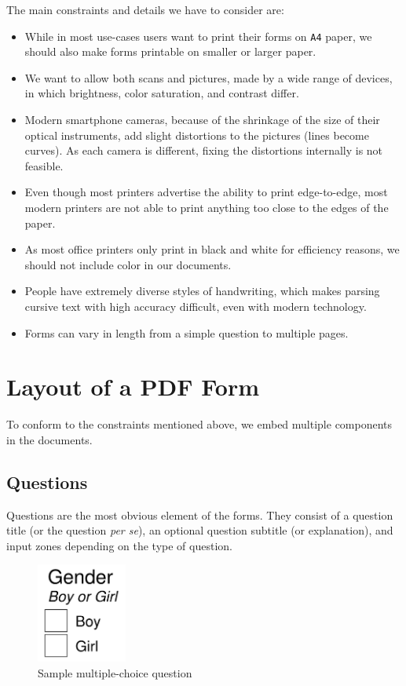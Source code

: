 \documentclass[11pt, a4paper]{report}
\def\code#1{\texttt{#1}}
\begin{document}
The main constraints and details we have to consider are:
\begin{itemize}
    \item While in most use-cases users want to print their forms on \code{A4} paper, we should also make forms printable on smaller or larger paper.
    \item We want to allow both scans and pictures, made by a wide range of devices, in which brightness, color saturation, and contrast differ.
    \item Modern smartphone cameras, because of the shrinkage of the size of their optical instruments, add slight distortions to the pictures (lines become curves). As each camera is different, fixing the distortions internally is not feasible.
    \item Even though most printers advertise the ability to print edge-to-edge, most modern printers are not able to print anything too close to the edges of the paper.
    \item As most office printers only print in black and white for efficiency reasons, we should not include color in our documents.
    \item People have extremely diverse styles of handwriting, which makes parsing cursive text with high accuracy difficult, even with modern technology.
    \item Forms can vary in length from a simple question to multiple pages.
\end{itemize}

\section{Layout of a PDF Form}

To conform to the constraints mentioned above, we embed multiple components in the documents.

\subsection{Questions}

Questions are the most obvious element of the forms. They consist of a question title (or the question \emph{per se}), an optional question subtitle (or explanation), and input zones depending on the type of question.

\begin{figure}[!h]
    \centering
    \includegraphics[width=8em]{images/screenshoots/sample-multiple-choice-question.png}
    \caption{Sample multiple-choice question}
    \label{multiple-choice-question}
\end{figure}
\end{document}
